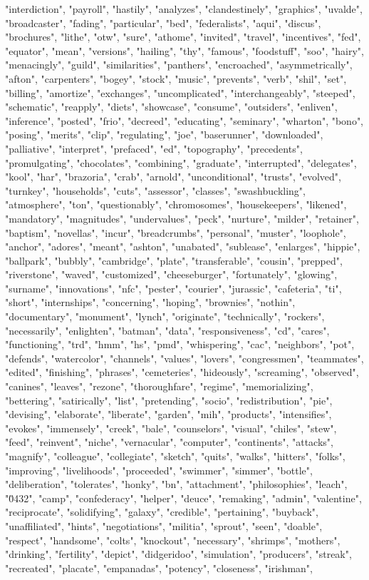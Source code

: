 "interdiction", "payroll", "hastily", "analyzes", "clandestinely", "graphics", "uvalde", "broadcaster", "fading", "particular", "bed", "federalists", "aqui", "discus", "brochures", "lithe", "otw", "sure", "athome", "invited", "travel", "incentives", "fed", "equator", "mean", "versions", "hailing", "thy", "famous", "foodstuff", "soo", "hairy", "menacingly", "guild", "similarities", "panthers", "encroached", "asymmetrically", "afton", "carpenters", "bogey", "stock", "music", "prevents", "verb", "shil", "set", "billing", "amortize", "exchanges", "uncomplicated", "interchangeably", "steeped", "schematic", "reapply", "diets", "showcase", "consume", "outsiders", "enliven", "inference", "posted", "frio", "decreed", "educating", "seminary", "wharton", "bono", "posing", "merits", "clip", "regulating", "joe", "baserunner", "downloaded", "palliative", "interpret", "prefaced", "ed", "topography", "precedents", "promulgating", "chocolates", "combining", "graduate", "interrupted", "delegates", "kool", "har", "brazoria", "crab", "arnold", "unconditional", "trusts", "evolved", "turnkey", "households", "cuts", "assessor", "classes", "swashbuckling", "atmosphere", "ton", "questionably", "chromosomes", "housekeepers", "likened", "mandatory", "magnitudes", "undervalues", "peck", "nurture", "milder", "retainer", "baptism", "novellas", "incur", "breadcrumbs", "personal", "muster", "loophole", "anchor", "adores", "meant", "ashton", "unabated", "sublease", "enlarges", "hippie", "ballpark", "bubbly", "cambridge", "plate", "transferable", "cousin", "prepped", "riverstone", "waved", "customized", "cheeseburger", "fortunately", "glowing", "surname", "innovations", "nfc", "pester", "courier", "jurassic", "cafeteria", "ti", "short", "internships", "concerning", "hoping", "brownies", "nothin", "documentary", "monument", "lynch", "originate", "technically", "rockers", "necessarily", "enlighten", "batman", "data", "responsiveness", "cd", "cares", "functioning", "trd", "hmm", "hs", "pmd", "whispering", "cac", "neighbors", "pot", "defends", "watercolor", "channels", "values", "lovers", "congressmen", "teammates", "edited", "finishing", "phrases", "cemeteries", "hideously", "screaming", "observed", "canines", "leaves", "rezone", "thoroughfare", "regime", "memorializing", "bettering", "satirically", "list", "pretending", "socio", "redistribution", "pie", "devising", "elaborate", "liberate", "garden", "mih", "products", "intensifies", "evokes", "immensely", "creek", "bale", "counselors", "visual", "chiles", "stew", "feed", "reinvent", "niche", "vernacular", "computer", "continents", "attacks", "magnify", "colleague", "collegiate", "sketch", "quits", "walks", "hitters", "folks", "improving", "livelihoods", "proceeded", "swimmer", "simmer", "bottle", "deliberation", "tolerates", "honky", "bn", "attachment", "philosophies", "leach", "\u0432", "camp", "confederacy", "helper", "deuce", "remaking", "admin", "valentine", "reciprocate", "solidifying", "galaxy", "credible", "pertaining", "buyback", "unaffiliated", "hints", "negotiations", "militia", "sprout", "seen", "doable", "respect", "handsome", "colts", "knockout", "necessary", "shrimps", "mothers", "drinking", "fertility", "depict", "didgeridoo", "simulation", "producers", "streak", "recreated", "placate", "empanadas", "potency", "closeness", "irishman", 